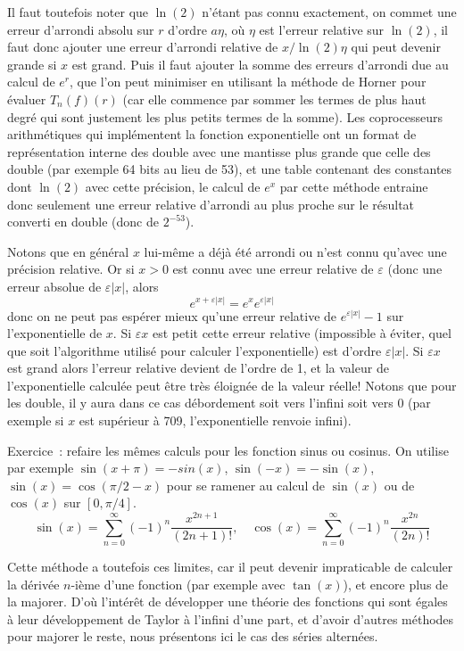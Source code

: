 \documentclass[a4paper,11pt]{article}
\begin{document}
Il faut toutefois noter que $\ln(2)$ n'étant pas connu exactement,
on commet une erreur d'arrondi absolu sur $r$ d'ordre $a \eta$,
où $\eta$ est l'erreur relative sur $\ln(2)$,
il faut donc ajouter une erreur d'arrondi relative de $x/\ln(2) \eta$
qui peut devenir grande si $x$ est grand. Puis il faut ajouter
la somme des erreurs d'arrondi due au calcul de $e^r$, que l'on
peut minimiser en utilisant la méthode de Horner pour évaluer
$T_n(f)(r)$ (car elle commence par sommer les termes de plus haut degré
qui sont justement les plus petits termes de la somme). 
Les coprocesseurs arithmétiques qui implémentent la fonction exponentielle
ont un format de représentation interne des double avec une mantisse
plus grande que celle des double (par exemple 64 bits au lieu de 53),
et une table contenant des constantes dont $\ln(2)$ avec cette précision,
le calcul de $e^x$ par cette méthode entraine donc seulement une erreur
relative d'arrondi au plus proche sur le résultat converti en double 
(donc de $2^{-53}$).

Notons que en général $x$ lui-même
a déjà été arrondi ou n'est connu qu'avec une précision relative.
Or si $x>0$ est connu avec une erreur relative de $\varepsilon$
(donc une erreur absolue de $\varepsilon |x|$, alors
\[ e^{x+\varepsilon |x|}= e^x e^{\varepsilon |x|} \]
donc on ne peut pas espérer mieux qu'une erreur relative de 
$e^{\varepsilon |x|}-1$ sur l'exponentielle de $x$. Si $\varepsilon x$ est petit
cette erreur relative (impossible à éviter, quel que soit
l'algorithme utilisé pour calculer l'exponentielle) 
est d'ordre $\varepsilon |x|$. Si $\varepsilon x$ est 
grand alors l'erreur relative devient de l'ordre de 1, et la valeur
de l'exponentielle calculée peut être très éloignée de la valeur
réelle! Notons que pour les double, il y aura dans ce cas débordement 
soit vers l'infini soit vers 0
(par exemple si $x$ est supérieur à 709, l'exponentielle renvoie infini).

Exercice~: refaire les mêmes calculs pour les fonction sinus ou cosinus.
On utilise par exemple $\sin(x+\pi)=-sin(x)$, $\sin(-x)=-\sin(x)$,
$\sin(x)=\cos(\pi/2-x)$ pour se ramener au calcul de $\sin(x)$ 
ou de $\cos(x)$ sur $[0,\pi/4]$.
\[ \sin(x)=\sum_{n=0}^\infty (-1)^n \frac{x^{2n+1}}{(2n+1)!},
\quad \cos(x)=\sum_{n=0}^\infty (-1)^n \frac{x^{2n}}{(2n)!} \]

Cette méthode a toutefois ces limites, car il peut devenir impraticable
de calculer la dérivée $n$-ième d'une fonction (par exemple avec $\tan(x)$),
et encore plus de la majorer. D'où l'intérêt de développer une théorie
des fonctions qui sont égales à leur développement de Taylor à l'infini
d'une part, et d'avoir d'autres méthodes pour majorer le reste, nous
présentons ici le cas des séries alternées.
\end{document}
